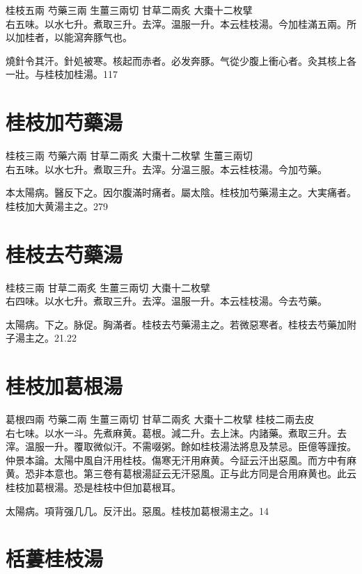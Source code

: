 桂枝{\scriptsize 五兩} 芍藥{\scriptsize 三兩} 生薑{\scriptsize 三兩切} 甘草{\scriptsize 二兩炙} 大棗{\scriptsize 十二枚擘}\\
右五味。以水七升。煮取三升。去滓。温服一升。本云桂枝湯。今加桂滿五兩。所以加桂者，以能瀉奔豚气也。

燒針令其汗。針処被寒。核起而赤者。必发奔豚。气從少腹上衝心者。灸其核上各一壯。与桂枝加桂湯。117

\section{桂枝加芍藥湯}

桂枝{\scriptsize 三兩} 芍藥{\scriptsize 六兩} 甘草{\scriptsize 二兩炙} 大棗{\scriptsize 十二枚擘} 生薑{\scriptsize 三兩切}\\
右五味。以水七升。煮取三升。去滓。分温三服。本云桂枝湯。今加芍藥。

{\khaai 本}太陽病。醫反下之。因尔腹滿时痛者。屬太陰。桂枝加芍藥湯主之。大実痛者。桂枝加大黄湯主之。279

\section{桂枝去芍藥湯}

桂枝{\scriptsize 三兩} 甘草{\scriptsize 二兩炙} 生薑{\scriptsize 三兩切} 大棗{\scriptsize 十二枚擘}\\
右四味。以水七升。煮取三升。去滓。温服一升。本云桂枝湯。今去芍藥。

太陽病。下之。脉促。胸滿者。桂枝去芍藥湯主之。若微{\khaai 惡}寒者。桂枝去芍藥加附子湯主之。21.22

\section{桂枝加葛根湯}

葛根{\scriptsize 四兩} 芍藥{\scriptsize 二兩} 生薑{\scriptsize 三兩切} 甘草{\scriptsize 二兩炙} 大棗{\scriptsize 十二枚擘} 桂枝{\scriptsize 二兩去皮}\\
右七味。以水一斗。先煮麻黄。葛根。減二升。去上沫。内諸藥。煮取三升。去滓。温服一升。覆取微似汗。不需啜粥。餘如桂枝湯法將息及禁忌。{\scriptsize 臣億等謹按。仲景本論。太陽中風自汗用桂枝。傷寒无汗用麻黄。今証云汗出惡風。而方中有麻黄。恐非本意也。第三卷有葛根湯証云无汗惡風。正与此方同是合用麻黄也。此云桂枝加葛根湯。恐是桂枝中但加葛根耳。}

太陽病。項背强几几。反汗出。惡風。桂枝{\khaai 加葛根}湯主之。14

\section{栝蔞桂枝湯}

